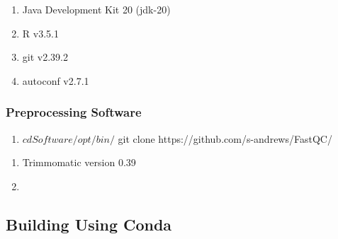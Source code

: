 \documentclass{article}
\begin{document}
\begin{enumerate}
\begin{script}
	$ sudo make install	# The last lines of output for this should be:
	Congratulations, you have successfully installed the MacPorts system. To get the Portfiles and update the system, add /opt/local/bin to your PATH and run:

	sudo port -v selfupdate

	Please read "man port", the MacPorts guide at https://guide.macports.org/ and Wiki at https://trac.macports.org/ for full documentation.

	Installing the "mpstats" port will enable submission of anonymous information about your system and installed ports to our database for statistical purposes: <https://ports.macports.org/>	

	# Finally, you can delete the installation directory.
	$ cd ../
	$ rm -r MacPorts-2.8.1
	\end{script}
	
	\item wget v1.21.4
		
	\begin{script}
	$ sudo port install wget
	\end{script}
	\item Java Development Kit 20 (jdk-20)
	\item R v3.5.1
	\item git v2.39.2
	\item autoconf v2.7.1
\end{enumerate}


\subsubsection{Preprocessing Software}
\begin{enumerate}
	\item\begin{script}
		
			$ cd Software/opt/bin/
			$ git clone https://github.com/s-andrews/FastQC/
		
	\end{script}
	
\end{enumerate}


\begin{enumerate}
	\item Trimmomatic version 0.39
	\item 
\end{enumerate}

\subsection{Building Using Conda}
\end{document}
